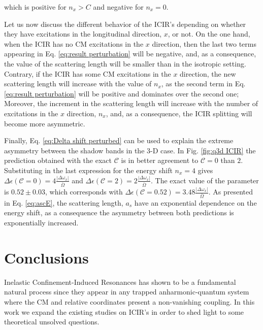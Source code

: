 \documentclass[aps,pre,twocolumn,superscriptaddress,showpacs]{revtex4-1}
\begin{document}
which is positive for $n_x > C$ and negative for $n_x=0$. 

Let us now discuss the different behavior of the ICIR's depending on whether they have excitations in the longitudinal direction, $x$, or not. On the one hand, when the ICIR has no CM excitations in the $x$ direction, then the last two terms appearing in Eq. \ref{eq:result perturbation} will be negative, and, as a consequence, the value of the scattering length will be smaller than in the isotropic setting. Contrary, if the ICIR has some CM excitations in the $x$ direction, the new scattering length will increase with the value of $n_x$, as the second term in Eq. \ref{eq:result perturbation} will be positive and dominates over the second one; Moreover, the increment in the scattering length will increase with the number of excitations in the $x$ direction, $n_x$, and, as a consequence, the ICIR splitting will become more asymmetric.

Finally, Eq. \ref{eq:Delta shift perturbed} can be used to explain the extreme asymmetry between the shadow bands in the 3-D case. In Fig. \ref{fig:q3d ICIR} the prediction obtained with the exact $\mathcal{C}$ is in better agreement to $\mathcal{C}=0$ than $2$. Substituting in the last expression for the energy shift $n_x = 4$ gives $\Delta \epsilon(\mathcal{C}=0) = 4\frac{|\Delta \omega_x|}{\bar{\Omega}}$ and $\Delta \epsilon(\mathcal{C}=2) = 2\frac{|\Delta \omega_x|}{\bar{\Omega}}$. The exact value of the parameter is $0.52 \pm 0.03$, which corresponds with $\Delta \epsilon(\mathcal{C}=0.52) = 3.48\frac{|\Delta \omega_x|}{\bar{\Omega}}$. As presented in Eq. \eqref{eq:ascE}, the scattering length, $a_s$ have an exponential dependence on the energy shift, as a consequence the asymmetry between both predictions is exponentially increased.

\section{Conclusions}
Inelastic Confinement-Induced Resonances has shown to be a fundamental natural process since they appear in any trapped anharmonic-quantum system where the CM and relative coordinates present a non-vanishing coupling. In this work we expand the existing studies on ICIR's in order to shed light to some theoretical unsolved questions. 
\end{document}
